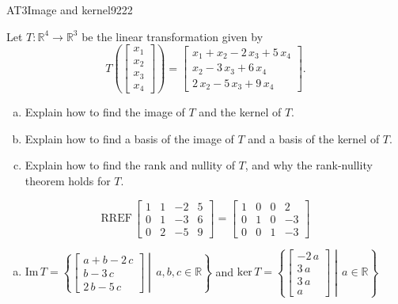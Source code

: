 \begin{exercise}{AT3}{Image and kernel}{9222} 
\begin{exerciseStatement} 

 Let \(T:\mathbb{R}^4 \to \mathbb{R}^3\) be the linear transformation given by \[T\left( \left[\begin{array}{c}
x_{1} \\
x_{2} \\
x_{3} \\
x_{4}
\end{array}\right] \right) = \left[\begin{array}{c}
x_{1} + x_{2} - 2 \, x_{3} + 5 \, x_{4} \\
x_{2} - 3 \, x_{3} + 6 \, x_{4} \\
2 \, x_{2} - 5 \, x_{3} + 9 \, x_{4}
\end{array}\right].\] 

 

\begin{enumerate}[(a)]
\item Explain how to find the image of \(T\) and the kernel of \(T\).
\item Explain how to find a basis of the image of \(T\) and a basis of the kernel of \(T\).
\item Explain how to find the rank and nullity of \(T\), and why the rank-nullity theorem holds for \(T\).
\end{enumerate}

     \end{exerciseStatement}
 \begin{exerciseAnswer} 

\[\mathrm{RREF}\,\left[\begin{array}{cccc}
1 & 1 & -2 & 5 \\
0 & 1 & -3 & 6 \\
0 & 2 & -5 & 9
\end{array}\right]=\left[\begin{array}{cccc}
1 & 0 & 0 & 2 \\
0 & 1 & 0 & -3 \\
0 & 0 & 1 & -3
\end{array}\right]\]

 

\begin{enumerate}[(a)]
\item  

 \(\mathrm{Im}\,T =  \left\{ \left[\begin{array}{c}
a + b - 2 \, c \\
b - 3 \, c \\
2 \, b - 5 \, c
\end{array}\right] \middle|\,a,b,c\in\mathbb{R}\right\}\) and \(\mathrm{ker}\,T = \left\{ \left[\begin{array}{c}
-2 \, a \\
3 \, a \\
3 \, a \\
a
\end{array}\right] \middle|\,a\in\mathbb{R}\right\}\) 


\end{enumerate}
\end{exerciseAnswer}
\end{exercise}
